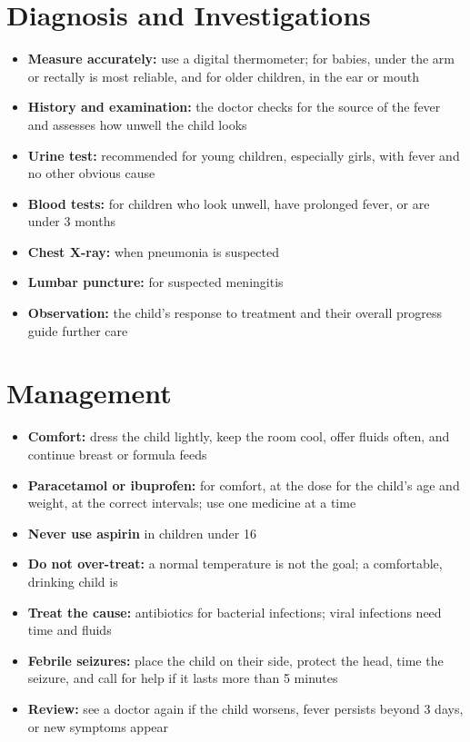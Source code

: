 \section*{Diagnosis and Investigations}
\begin{itemize}
    \item \textbf{Measure accurately:} use a digital thermometer; for babies, under the arm or rectally is most reliable, and for older children, in the ear or mouth
    \item \textbf{History and examination:} the doctor checks for the source of the fever and assesses how unwell the child looks
    \item \textbf{Urine test:} recommended for young children, especially girls, with fever and no other obvious cause
    \item \textbf{Blood tests:} for children who look unwell, have prolonged fever, or are under 3 months
    \item \textbf{Chest X-ray:} when pneumonia is suspected
    \item \textbf{Lumbar puncture:} for suspected meningitis
    \item \textbf{Observation:} the child's response to treatment and their overall progress guide further care
\end{itemize}

\section*{Management}
\begin{itemize}
    \item \textbf{Comfort:} dress the child lightly, keep the room cool, offer fluids often, and continue breast or formula feeds
    \item \textbf{Paracetamol or ibuprofen:} for comfort, at the dose for the child's age and weight, at the correct intervals; use one medicine at a time
    \item \textbf{Never use aspirin} in children under 16
    \item \textbf{Do not over-treat:} a normal temperature is not the goal; a comfortable, drinking child is
    \item \textbf{Treat the cause:} antibiotics for bacterial infections; viral infections need time and fluids
    \item \textbf{Febrile seizures:} place the child on their side, protect the head, time the seizure, and call for help if it lasts more than 5 minutes
    \item \textbf{Review:} see a doctor again if the child worsens, fever persists beyond 3 days, or new symptoms appear
\end{itemize}

